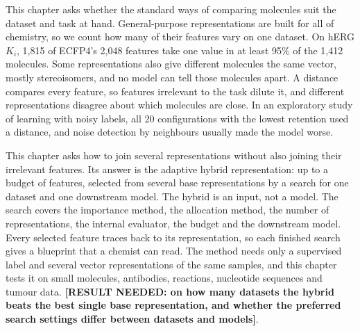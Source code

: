 This chapter asks whether the standard ways of comparing molecules suit the dataset and task at hand. General-purpose representations are built for all of chemistry, so we count how many of their features vary on one dataset. On hERG $K_i$, 1,815 of ECFP4's 2,048 features take one value in at least 95\% of the 1,412 molecules. Some representations also give different molecules the same vector, mostly stereoisomers, and no model can tell those molecules apart. A distance compares every feature, so features irrelevant to the task dilute it, and different representations disagree about which molecules are close. In an exploratory study of learning with noisy labels, all 20 configurations with the lowest retention used a distance, and noise detection by neighbours usually made the model worse.

This chapter asks how to join several representations without also joining their irrelevant features. Its answer is the adaptive hybrid representation: up to a budget of features, selected from several base representations by a search for one dataset and one downstream model. The hybrid is an input, not a model. The search covers the importance method, the allocation method, the number of representations, the internal evaluator, the budget and the downstream model. Every selected feature traces back to its representation, so each finished search gives a blueprint that a chemist can read. The method needs only a supervised label and several vector representations of the same samples, and this chapter tests it on small molecules, antibodies, reactions, nucleotide sequences and tumour data. \textbf{[RESULT NEEDED: on how many datasets the hybrid beats the best single base representation, and whether the preferred search settings differ between datasets and models]}.

